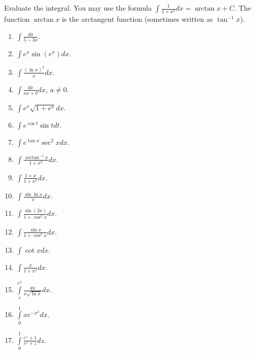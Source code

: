 \begin{problem}
Evaluate the integral. You may use the formula $\int \frac{1}{1+x^2}dx=\arctan x+C $. The function $\arctan x$ is the arctangent function (sometimes written as $\tan^{-1}x$).
\begin{multicols}{3}
\begin{enumerate}
\item $\displaystyle\int \frac{dx}{5-3x}$.
\item $\displaystyle\int e^x\sin (e^x) dx$.
\item $\displaystyle\int \frac{(\ln x)^2}{x} dx$.
\item $\displaystyle\int \frac{dx}{ax+b} dx$, $a\neq 0$.
\item $\displaystyle\int e^x\sqrt{1+e^x} dx$.
\item $\displaystyle\int e^{\cos t }\sin t dt$.
\item $\displaystyle\int e^{\tan x}\sec^2x dx$.
\item $\displaystyle\int \frac{\arctan^{-1}x}{1+x^2} dx$. 
\item $\displaystyle\int \frac{1+x}{1+x^2} dx$. 
\item $\displaystyle\int \frac{\sin \ln x}{x} dx$.
\item $\displaystyle\int \frac{\sin (2x)}{1+\cos^2x}dx$.
\item $\displaystyle\int \frac{\sin x}{1+\cos^2 x} dx$.
\item $\displaystyle\int \cot x dx$.
\item $\displaystyle\int \frac{x}{1+x^4}dx$.
\item $\displaystyle\int\limits_{e}^{e^4}\frac{dx}{x\sqrt{\ln x}} dx$.
\item $\displaystyle\int\limits_{0}^{1}xe^{-x^2} dx$.
\item $\displaystyle\int\limits_{0}^{1}\frac{e^z+1}{e^z+z} dz$.
\end{enumerate}
\end{multicols}
\end{problem}